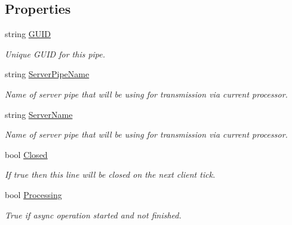 \subsection*{Properties}
\begin{DoxyCompactItemize}
\item 
string \mbox{\hyperlink{class_pipes_provider_1_1_transmission_line_a9227989e298eefad921d81d3098d5148}{G\+U\+ID}}
\begin{DoxyCompactList}\small\item\em Unique G\+U\+ID for this pipe. \end{DoxyCompactList}\item 
string \mbox{\hyperlink{class_pipes_provider_1_1_transmission_line_a6acb67e0969ca43a54c9895ab1cdaae8}{Server\+Pipe\+Name}}
\begin{DoxyCompactList}\small\item\em Name of server pipe that will be using for transmission via current processor. \end{DoxyCompactList}\item 
string \mbox{\hyperlink{class_pipes_provider_1_1_transmission_line_a549bd893bb66b3f56e87209d3e776227}{Server\+Name}}
\begin{DoxyCompactList}\small\item\em Name of server pipe that will be using for transmission via current processor. \end{DoxyCompactList}\item 
bool \mbox{\hyperlink{class_pipes_provider_1_1_transmission_line_a4edc70c5ef641b2c600b69b65ff4ba00}{Closed}}
\begin{DoxyCompactList}\small\item\em If true then this line will be closed on the next client tick. \end{DoxyCompactList}\item 
bool \mbox{\hyperlink{class_pipes_provider_1_1_transmission_line_af5717e4ea0ba1bbca5685de995c1c88f}{Processing}}
\begin{DoxyCompactList}\small\item\em True if async operation started and not finished. \end{DoxyCompactList}\item 

\end{DoxyCompactItemize}
